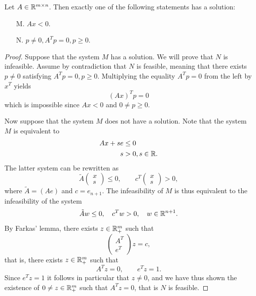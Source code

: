 \documentclass[10pt,a4paper]{article}
\begin{document}
\begin{theorem}\label{thm:gordon}
	Let $A\in\mathbb{R}^{m\times n}$. Then exactly one of the following statements has a solution:
	\begin{itemize}
		\item[M.] $Ax<0$.
		\item[N.] $p\neq 0, A^Tp = 0, p\geq 0$.
	\end{itemize}
\end{theorem}
\begin{proof}
	Suppose that the system $M$ has a solution. We will prove that $N$ is infeasible. Assume by contradiction that $N$ is feasible, meaning that there exists $p\neq0$ satisfying $A^Tp=0, p\geq0$. Multiplying the equality $A^Tp=0$ from the left by $x^T$ yields 
	\begin{equation*}
		(Ax)^Tp=0
	\end{equation*}
which is impossible since $Ax<0$ and $0\neq p\geq0$.
\par Now suppose that the system $M$ does not have a solution. Note that the system $M$ is equivalent to 
\begin{align*}
	Ax+se&\leq 0\\
	s&>0, s\in \mathbb{R}. 
\end{align*}
The latter system can be rewritten as 
\begin{equation*}
	\tilde{A}\begin{pmatrix}
		x\\
		s
	\end{pmatrix}\leq 0, \qquad c^T\begin{pmatrix}
	x\\
	s
\end{pmatrix}>0,
\end{equation*}
where $\tilde{A}=(A e)$ and $c=e_{n+1}$. The infeasibility of $M$ is thus equivalent to the infeasibility of the system 
\begin{equation*}
\tilde{A}w\leq 0, \quad c^Tw>0,\quad w\in \mathbb{R}^{n+1}.
\end{equation*}
By Farkas' lemma, there exists $z\in \mathbb{R}^{m}_+$ such that 
\begin{equation*}
	\begin{pmatrix}
		A^T\\
		e^T
	\end{pmatrix}z = c,
\end{equation*}
that is, there exists $z\in \mathbb{R}^m_+$ such that 
\begin{equation*}
	A^Tz=0, \qquad e^Tz=1.
\end{equation*}
Since $ e^Tz=1$ it follows in particular that $z\neq 0$, and we have thus shown the existence of $0\neq z \in \mathbb{R}^m_+$ such that $A^Tz=0$, that is $N$ is feasible.
\end{proof}
\end{document}
